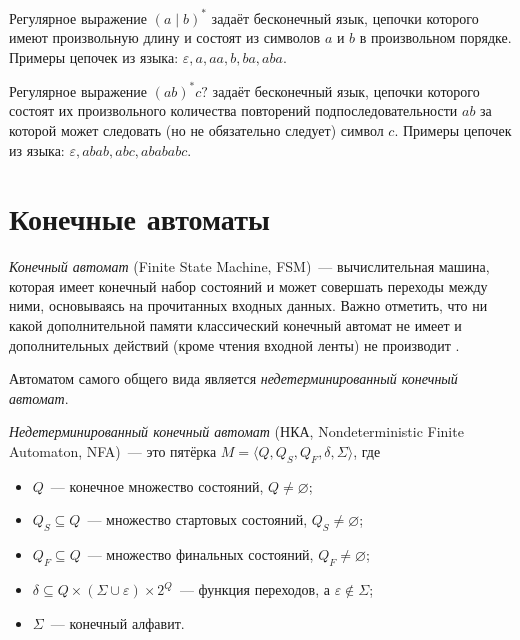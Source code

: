 \begin{example}
    Регулярное выражение $(a\mid b)^*$ задаёт бесконечный язык, цепочки которого имеют произвольную длину и состоят из символов $a$ и $b$ в произвольном порядке.
    Примеры цепочек из языка: $\varepsilon, a, aa, b, ba, aba$.
\end{example}

\begin{example}
    Регулярное выражение $(ab)^*c?$ задаёт бесконечный язык, цепочки которого состоят их произвольного количества повторений подпоследовательности $ab$ за которой может следовать (но не обязательно следует) символ $c$.
    Примеры цепочек из языка: $\varepsilon, abab, abc, abababc$.
\end{example}

\section{Конечные автоматы}

\emph{Конечный автомат} (Finite State Machine, FSM)~--- вычислительная машина, которая имеет конечный набор состояний и может совершать переходы между ними, основываясь на прочитанных входных данных.
Важно отметить, что ни какой дополнительной памяти классический конечный автомат не имеет и дополнительных действий (кроме чтения входной ленты) не производит %
.

Автоматом самого общего вида является \emph{недетерминированный конечный автомат}. 
\begin{definition}
    \label{def:NondeterminicticFiniteAutomata}
    \emph{Недетерминированный конечный автомат} (НКА, Nondeterministic Finite Automaton, NFA)~--- это пятёрка $M = \langle Q, Q_S, Q_F, \delta, \Sigma \rangle$, где
    \begin{itemize}
        \item $Q$~--- конечное множество состояний, $Q \neq \varnothing$;
        \item $Q_S \subseteq Q$~--- множество стартовых состояний, $Q_S \neq \varnothing$;
        \item $Q_F \subseteq Q$~--- множество финальных состояний, $Q_F \neq \varnothing$;
        \item $\delta \subseteq Q \times (\Sigma \cup \varepsilon) \times 2^Q$~--- функция переходов, а $\varepsilon \notin \Sigma$;
        \item $\Sigma$~--- конечный алфавит.
    \end{itemize}
\end{definition}

